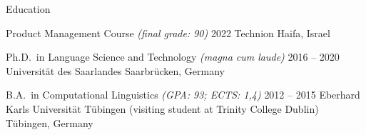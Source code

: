 \documentclass{resume} %
\begin{document}
\begin{rSection}{Education}
	
	\begin{rSubsection}
		{Product Management Course \footnotesize{\textit{(final grade: 90)}}}
		{2022}
		{Technion}
		{Haifa, Israel}
		
		\setlength{\itemindent}{.5cm}
		
		\item[]\vspace{-0.5cm}%
	\end{rSubsection}
	
	\begin{rSubsection}
		{Ph.D.\ in Language Science and Technology \footnotesize{\textit{(magna cum laude)}}}
		{2016 -- 2020}
		{Universität des Saarlandes}
		{Saarbrücken, Germany}
		
		\setlength{\itemindent}{.5cm}
		
		\item[]\vspace{-0.5cm}%
	\end{rSubsection}
	
	
	\begin{rSubsection}
		{B.A.\ in Computational Linguistics \footnotesize{\textit{(GPA: 93; ECTS: 1,4)}}}
		{2012 -- 2015}
		{Eberhard Karls Universität Tübingen (visiting student at Trinity College Dublin)}
		{Tübingen, Germany}
		

\end{rSubsection}
\end{rSection}
\end{document}
